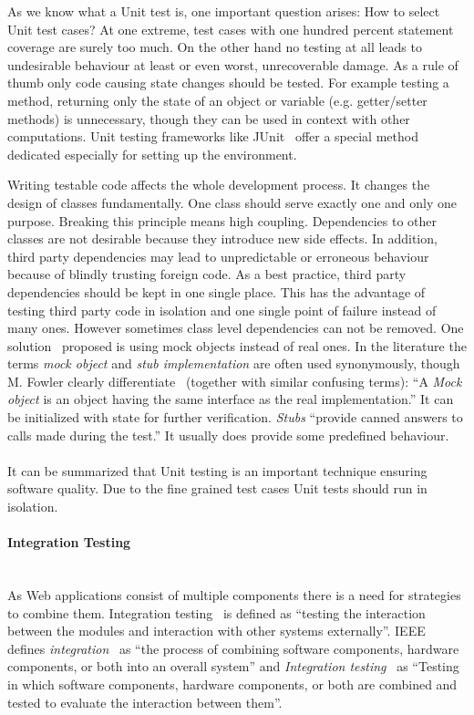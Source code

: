 \documentclass[12pt, notitlepage]{article}
\begin{document}
As we know what a Unit test is, one important question arises: How to select Unit test cases? At one extreme, test cases with one hundred percent statement coverage
are surely too much. On the other hand no testing at all leads to undesirable behaviour at least or even worst, unrecoverable damage. 
As a rule of thumb only code causing state changes should be tested. For example testing a method, returning only the state of an object or variable (e.g. getter/setter methods) is unnecessary, though they can be used in context with other computations. Unit testing frameworks 
like JUnit~\cite{junit} offer a special method dedicated especially for setting up the environment.

Writing testable code affects the whole development process. It changes the design of classes fundamentally. One class should serve exactly one and only one purpose. Breaking this principle means high coupling. Dependencies to other classes are not desirable because they introduce new
side effects. In addition, third party dependencies may lead to unpredictable or erroneous behaviour because of blindly trusting foreign code.
As a best practice, third party dependencies should be kept in one single place. This has the advantage of testing third party code in isolation 
and one single point of failure instead of many ones. However sometimes class level dependencies can not be removed.
One solution~\citet{mock-objects} proposed is using mock objects instead of real ones. In the literature the terms \textit{mock object} and \textit{stub implementation} are often used synonymously, though M. Fowler clearly differentiate~\cite{fowlermocks} (together with similar confusing terms): \enquote{A \textit{Mock object} is an object having the same interface as the real implementation.} It can be initialized with state for further verification. 
\textit{Stubs} \enquote{provide canned answers to calls made during the test.} It usually does provide some predefined behaviour.\\\\ 
It can be summarized that Unit testing is an important technique ensuring software quality. Due to the fine grained test cases Unit tests should run in isolation. 

\paragraph{Integration Testing} ~\\
As Web applications consist of multiple components there is a need for strategies to combine them. Integration testing~\cite{sw-testing-quality-assurance} is defined as \enquote{testing the interaction between the modules and interaction with other systems externally}. IEEE defines
\textit{integration}~\cite{ieee-definition} as \enquote{the process of combining software components, hardware components, or both into an overall system} and \textit{Integration testing}~\cite{ieee-definition} as 
\enquote{Testing in which software components, hardware components, or both are combined and tested to evaluate the interaction between them}.
\end{document}
